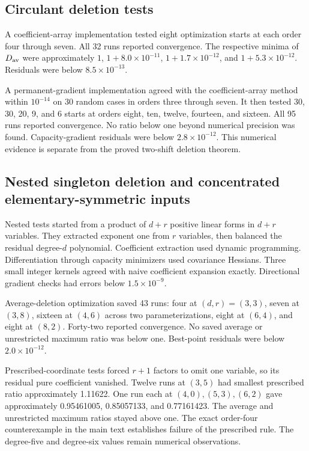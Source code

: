 \subsection{Circulant deletion tests}\label{app:finite-7}

A coefficient-array implementation tested eight optimization starts at each order four through seven. All 32 runs reported convergence. The respective minima of \(D_{\rm av}\) were approximately \(1\), \(1+8.0\times10^{-11}\), \(1+1.7\times10^{-12}\), and \(1+5.3\times10^{-12}\). Residuals were below \(8.5\times10^{-13}\).

A permanent-gradient implementation agreed with the coefficient-array method within \(10^{-14}\) on 30 random cases in orders three through seven. It then tested 30, 30, 20, 9, and 6 starts at orders eight, ten, twelve, fourteen, and sixteen. All 95 runs reported convergence. No ratio below one beyond numerical precision was found. Capacity-gradient residuals were below \(2.8\times10^{-12}\). This numerical evidence is separate from the proved two-shift deletion theorem.

\subsection{Nested singleton deletion and concentrated elementary-symmetric inputs}\label{app:finite-8}

Nested tests started from a product of \(d+r\) positive linear forms in \(d+r\) variables. They extracted exponent one from \(r\) variables, then balanced the residual degree-\(d\) polynomial. Coefficient extraction used dynamic programming. Differentiation through capacity minimizers used covariance Hessians. Three small integer kernels agreed with naive coefficient expansion exactly. Directional gradient checks had errors below \(1.5\times10^{-9}\).

Average-deletion optimization saved 43 runs: four at \((d,r)=(3,3)\), seven at \((3,8)\), sixteen at \((4,6)\) across two parameterizations, eight at \((6,4)\), and eight at \((8,2)\). Forty-two reported convergence. No saved average or unrestricted maximum ratio was below one. Best-point residuals were below \(2.0\times10^{-12}\).

Prescribed-coordinate tests forced \(r+1\) factors to omit one variable, so its residual pure coefficient vanished. Twelve runs at \((3,5)\) had smallest prescribed ratio approximately 1.11622. One run each at \((4,0),(5,3),(6,2)\) gave approximately 0.95461005, 0.85057133, and 0.77161423. The average and unrestricted maximum ratios stayed above one. The exact order-four counterexample in the main text establishes failure of the prescribed rule. The degree-five and degree-six values remain numerical observations.

